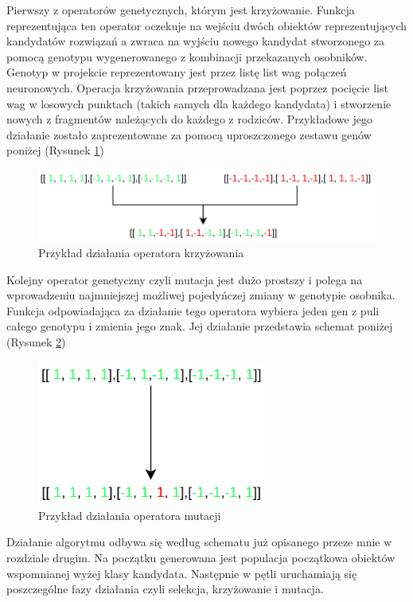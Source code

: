 \documentclass[12pt, oneside, a4paper]{report}
\begin{document}
Pierwszy z operatorów genetycznych, którym jest krzyżowanie. Funkcja reprezentująca ten operator oczekuje na wejściu dwóch obiektów reprezentujących kandydatów rozwiązań a zwraca na wyjściu nowego kandydat stworzonego za pomocą genotypu wygenerowanego z kombinacji przekazanych osobników. Genotyp w projekcie reprezentowany jest przez listę list wag połączeń neuronowych. Operacja krzyżowania przeprowadzana jest poprzez pocięcie list wag w losowych punktach (takich samych dla każdego kandydata) i stworzenie nowych z fragmentów należących do każdego z rodziców. Przykładowe jego działanie zostało zaprezentowane za pomocą uproszczonego zestawu genów poniżej (Rysunek \ref{fig: 4.3.crossing})

\begin{figure}[h]
	\centering
	\includegraphics[width=14cm]{fig431.png}
	\caption{Przykład działania operatora krzyżowania}
	\label{fig: 4.3.crossing}
\end{figure}
\newpage

Kolejny operator genetyczny czyli mutacja jest dużo prostszy i polega na wprowadzeniu najmniejszej możliwej pojedyńczej zmiany w genotypie osobnika. Funkcja odpowiadająca za działanie tego operatora wybiera jeden gen z puli całego genotypu i zmienia jego znak. Jej działanie przedstawia schemat poniżej (Rysunek \ref{fig: 4.3.mutation})

\begin{figure}[h]
	\centering
	\includegraphics[width=7.5cm]{fig432.png}
	\caption{Przykład działania operatora mutacji}
	\label{fig: 4.3.mutation}
\end{figure}

Działanie algorytmu odbywa się według schematu już opisanego przeze mnie w rozdziale drugim. Na początku generowana jest populacja początkowa obiektów wspomnianej wyżej klasy kandydata. Następnie w pętli uruchamiają się poszczególne fazy działania czyli selekcja, krzyżowanie i mutacja.
\end{document}
